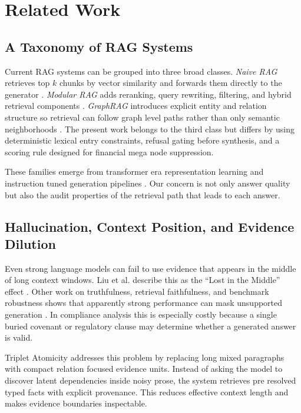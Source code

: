 \documentclass[conference]{IEEEtran}
\begin{document}
\section{Related Work}
\subsection{A Taxonomy of RAG Systems}
Current RAG systems can be grouped into three broad classes. \textit{Naive RAG} retrieves top $k$ chunks by vector similarity and forwards them directly to the generator \cite{lewis2020rag}. \textit{Modular RAG} adds reranking, query rewriting, filtering, and hybrid retrieval components \cite{karpukhin2020dpr,colbert2020,splade2021,hyde2023}. \textit{GraphRAG} introduces explicit entity and relation structure so retrieval can follow graph level paths rather than only semantic neighborhoods \cite{edge2024graphrag}. The present work belongs to the third class but differs by using deterministic lexical entry constraints, refusal gating before synthesis, and a scoring rule designed for financial mega node suppression.

These families emerge from transformer era representation learning and instruction tuned generation pipelines \cite{attention2017,bert2019,roberta2019,sbert2019,t52020,instructiontuning2022}. Our concern is not only answer quality but also the audit properties of the retrieval path that leads to each answer.

\subsection{Hallucination, Context Position, and Evidence Dilution}
Even strong language models can fail to use evidence that appears in the middle of long context windows. Liu et al. describe this as the ``Lost in the Middle'' effect \cite{liu2024lostmiddle}. Other work on truthfulness, retrieval faithfulness, and benchmark robustness shows that apparently strong performance can mask unsupported generation \cite{truthfulqa2022,ragas2023,hotpotqa2018,fever2018}. In compliance analysis this is especially costly because a single buried covenant or regulatory clause may determine whether a generated answer is valid.

Triplet Atomicity addresses this problem by replacing long mixed paragraphs with compact relation focused evidence units. Instead of asking the model to discover latent dependencies inside noisy prose, the system retrieves pre resolved typed facts with explicit provenance. This reduces effective context length and makes evidence boundaries inspectable.
\end{document}

